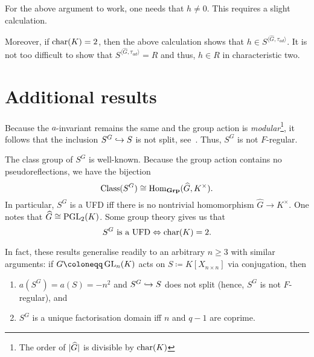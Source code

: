 \documentclass[12pt]{article}
\begin{document}
	\begin{rem}
		For the above argument to work, one needs that $h \neq 0$. 
		This requires a slight calculation. 

		Moreover, if $\operatorname{char}(K) = 2$, then the above calculation shows that $h \in S^{\langle \widehat{G}, \tau_{ad} \rangle}$. 
		It is not too difficult to show that $S^{\langle \widehat{G}, \tau_{ad} \rangle} = R$ and thus, $h \in R$ in characteristic two.
	\end{rem}

\section{Additional results}
	
	Because the $a$-invariant remains the same and the group action is \emph{modular}\footnote{The order of ${\lvert \widehat{G} \lvert}$ is divisible by $\operatorname{char}(K)$}, it follows that the inclusion $S^{G} \hookrightarrow S$ is not split, see~\Cite[Corollary 4.2]{GoelJeffriesSingh}. 
	Thus, $S^{G}$ is not $F$-regular.

	The class group of $S^{G}$ is well-known. Because the group action contains no pseudoreflections, we have the bijection
	\begin{equation*} 
		\operatorname{Class}(S^{G}) \cong \operatorname{Hom}_{\mathbf{Grp}}(\widehat{G}, K^{\times}).
	\end{equation*}
	In particular, $S^{G}$ is a UFD iff there is no nontrivial homomorphism $\widehat{G} \to K^{\times}$. 
	One notes that $\widehat{G} \cong \operatorname{PGL}_{2}(K)$. 
	Some group theory gives us that
	\begin{equation*} 
		\text{$S^{G}$ is a UFD} \Leftrightarrow \operatorname{char}(K) = 2.
	\end{equation*}

	In fact, these results generalise readily to an arbitrary $n \ge 3$ with similar arguments: 
	if $G \coloneqq \GL_{n}(K)$ acts on $S \coloneqq K[X_{n \times n}]$ via conjugation, then
	\begin{enumerate}[label=(\alph*)]
		\item $a(S^{G}) = a(S) = -n^{2}$ and $S^{G} \hookrightarrow S$ does not split (hence, $S^{G}$ is not $F$-regular), and
		\item $S^{G}$ is a unique factorisation domain iff $n$ and $q - 1$ are coprime.
	\end{enumerate}

\printbibliography
\end{document}
